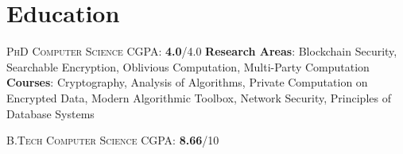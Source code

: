 \documentclass[13pt, a4paper, roman]{moderncv} %
\begin{document}
\newpage

\makecvtitle %

\vspace{-3mm}
\section{Education}

{
\newline{} \textsc{PhD Computer Science} 
\newline{}CGPA: \textbf{4.0}/4.0
\newline{} \textbf{Research Areas}: Blockchain Security, Searchable Encryption, Oblivious Computation, Multi-Party Computation
}
{}
{
\textbf{Courses}: Cryptography, Analysis of Algorithms, Private Computation on Encrypted Data, Modern Algorithmic Toolbox, Network Security, Principles of Database Systems}

{
\newline{} \textsc{B.Tech Computer Science} 
\newline{}CGPA: \textbf{8.66}/10
}
{}
{}

\end{document}
